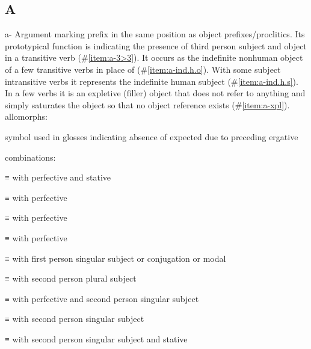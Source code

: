 
\subsection{A}\label{sec:alphalist-a}
\raggedright
\begin{morphdesc}[series=alphalist]
\item[a-]\label{m:a-}
	Argument marking prefix in the same position as object prefixes/proclitics.
	Its prototypical function is indicating the presence of third person subject and object
		in a transitive verb
		(\#\ref{item:a-3>3}).
	It occurs as the indefinite nonhuman object of a few transitive verbs in place of 
		(\#\ref{item:a-ind.h.o}).
	With some subject intransitive verbs it represents the indefinite human subject
		(\#\ref{item:a-ind.h.s}).
	In a few verbs it is an expletive (filler) object that does not refer to anything and
		simply saturates the object so that no object reference exists
		(\#\ref{item:a-xpl}).
	\newline
	allomorphs:
	\begin{allolist}
	\item[\X{ⱥ-}]	symbol used in glosses indicating absence of expected 
			due to preceding ergative 
	\end{allolist}
	combinations:
	\begin{allolist}
	\item[\X{aawa}]	≡  with perfective  and stative \X{wa-}
	\item[\X{am}]	≡  with perfective \X{m-}
	\item[\X{aw}]	≡  with perfective \X[w-pfv]{w-}
	\item[\X{awu}]	≡  with perfective \X{wu-}
	\item[\X{ax̱}]	≡  with first person singular subject \X[x̱-1sg]{x̱-}
				or  conjugation \X[x̱-g̱cnj]{x̱-}
				or modal \X[x̱-mod]{x̱-}
	\item[{\X[aÿ-a-ÿ]{aÿ}}]
			≡  with second person plural subject \X[ÿ-2pl]{ÿ-}
	\item[{\X[aÿ-a-ʷ-ÿ]{aÿ}}]
			≡  with perfective \X[ʷ-pfv]{ʷ-}
				and second person singular subject \X[ÿ-2sg]{ÿ-}
	\item[\X{ee}]	≡  with second person singular subject \X[i-2sg]{i-}
	\item[{\X[eeÿa-a-i-ÿa]{eeÿa}}]
			≡  with second person singular subject \X[i-2sg]{i-}
				and stative \X[ÿa-stv]{ÿa-}

\end{allolist}
\end{morphdesc}
